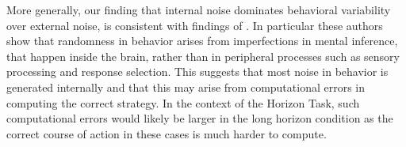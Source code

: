 \documentclass[12pt]{article}
\begin{document}
	More generally, our finding that internal noise dominates behavioral variability over external noise, is consistent with findings of \cite{drugowitsch16}. In particular these authors show that randomness in behavior arises from imperfections in mental inference, that happen inside the brain, rather than in peripheral processes such as sensory processing and response selection. This suggests that most noise in behavior is generated internally and that this may arise from  computational errors in computing the correct strategy. In the context of the Horizon Task, such computational errors would likely be larger  in the long horizon condition as the correct course of action in these cases is much harder to compute.
	
	
	
	
\end{document}

